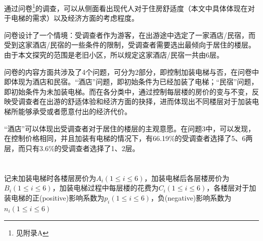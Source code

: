 \documentclass[lang=cn,a4paper]{elegantpaper}
\begin{document}
    通过问卷\footnote{见附录A}的调查，可以从侧面看出现代人对于住房舒适度（本文中具体体现在对于电梯的需求）以及经济方面的考虑程度。

    问卷设计了一个情境：受调查者作为游客，在出游途中选定了一家酒店/民宿，而受到这家酒店/民宿的一些条件的限制，受调查者需要选出最倾向于居住的楼层。由于本文探究的范围是老旧小区，所以规定这家酒店/民宿一共由6层。

    问卷的内容方面共涉及了4个问题，可分为2部分，即控制加装电梯与否，在问卷中即体现为酒店和民宿。“酒店”问题，即初始条件为已经加装了电梯；“民宿”问题，即初始条件为未加装电梯。而在各分类中，通过控制每层楼的房价的变与不变，反映受调查者在出游的舒适体验和经济方面的抉择，进而体现出不同楼层对于加装电梯所能够承受或者愿意付出的经济代价。
    
    “酒店”可以体现出受调查者对于居住的楼层的主观意愿。在问题3中，可以发现，在控制价格相同，并且加装有电梯的情况下，有66.19\%的受调查者选择了5、6两层，而只有3.6\%的受调查者选择了1、2层。
    

    \section{}
    \subsection{}
    记未加装电梯时各楼层房价为$A_i(1\leqslant i\leqslant 6)$，加装电梯后各层楼房价为$B_i(1\leqslant i\leqslant 6)$，加装电梯过程中每层楼的花费为$C_i(1\leqslant i\leqslant 6)$，各楼层对于加装电梯的正(positive)影响系数为$p_i(1\leqslant i\leqslant 6)$，负(negative)影响系数为$n_i(1\leqslant i\leqslant 6)$
\end{document}
